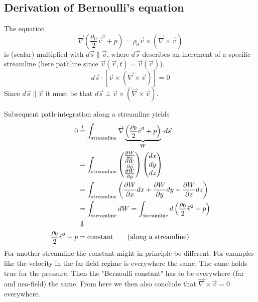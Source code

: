 \subsection{Derivation of Bernoulli's equation}
The equation
\begin{equation}
\vec{\nabla}\left(\frac{\rho_0}{2}\vec{v}^2+p\right) = \rho_0\vec{v}\times\left(\vec{\nabla}\times\vec{v}\right)
\end{equation}
is (scalar) multiplied with $d\vec{s}\parallel\vec{v}$, where $d\vec{s}$ describes an increment of a specific streamline (here pathline since $\vec{v}(\vec{r},t) = \vec{v}(\vec{r})$).
\begin{equation}
d\vec{s}\cdot\left[\vec{v}\times\left(\vec{\nabla}\times\vec{v}\right)\right]=0
\end{equation}
Since $d\vec{s}\parallel\vec{v}$ it must be that $d\vec{s}\perp\vec{v}\times\left(\vec{\nabla}\times\vec{v}\right)$.

Subsequent path-integration along a streamline yields
\begin{align}
0 &\overset{!}{=} \int_\text{streamline}\vec{\nabla}\underbrace{\left(\frac{\rho_0}{2}\vec{v}^2+p\right)}_W\cdot d\vec{s}\\
&= \int_\text{streamline} \begin{pmatrix}
\frac{\partial W}{\partial x}\\
\frac{\partial W}{\partial y}\\
\frac{\partial W}{\partial y}
\end{pmatrix}
\begin{pmatrix}
dx\\dy\\dz
\end{pmatrix}\\
&= \int_\text{streamline} \left(\frac{\partial W}{\partial x}dx+\frac{\partial W}{\partial y}dy+\frac{\partial W}{\partial z}dz\right)\\
&= \int_\text{streamline}dW = \int_\text{streamline} d\left(\frac{\rho_0}{2}\vec{v}^2+p\right)\\
&\Downarrow\notag\\
\frac{\rho_0}{2}\vec{v}^2+p&=\text{constant}\qquad\text{(along a streamline)}
\end{align}
For another streamline the constant might in principle be different. For examples like the velocity in the far-field regime is everywhere the same. The same holds true for the pressure. Then the "Bernoulli constant" has to be everywhere (far and nea-field) the same. From here we then also conclude that $\vec{\nabla}\times\vec{v}=0$ everywhere.

